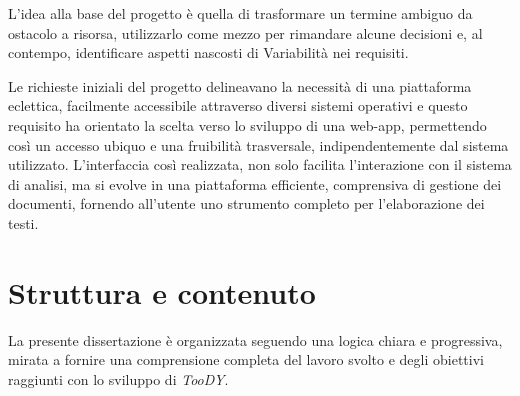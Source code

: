 \documentclass[12pt]{report}
\newcommand{\toody}{\textsl{TooDY}\xspace}
\begin{document}
L’idea alla base del progetto è quella di trasformare un termine ambiguo da ostacolo a risorsa, utilizzarlo come mezzo per rimandare alcune decisioni e, al contempo, identificare aspetti nascosti di Variabilità nei requisiti.

Le richieste iniziali del progetto delineavano la necessità di una piattaforma eclettica, facilmente accessibile attraverso diversi sistemi operativi e questo requisito ha orientato la scelta verso lo sviluppo di una web-app, permettendo così un accesso ubiquo e una fruibilità trasversale, indipendentemente dal sistema utilizzato. L'interfaccia così realizzata, non solo facilita l'interazione con il sistema di analisi, ma si evolve in una piattaforma efficiente, comprensiva di gestione dei documenti, fornendo all'utente uno strumento completo per l'elaborazione dei testi.


\section{Struttura e contenuto}
La presente dissertazione è organizzata seguendo una logica chiara e progressiva, mirata a fornire una comprensione completa del lavoro svolto e degli obiettivi raggiunti con lo sviluppo di \toody.

\end{document}
